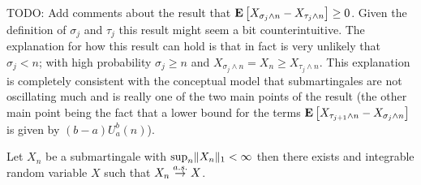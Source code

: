 TODO: Add comments about the result that $\textbf{E}\left[X_{\sigma_j
    \wedge n} - X_{\tau_j    \wedge n} \right]\geq 0$.  Given the definition
of $\sigma_j$ and $\tau_j$ this result might seem a bit
counterintuitive.  The explanation for how this result can hold is
that in fact is very unlikely that $\sigma_j < n$; with high
probability $\sigma_j \geq n$ and $X_{\sigma_j    \wedge n} = X_n \geq
X_{\tau_j \wedge n}$.  This explanation is completely consistent with
the conceptual model that submartingales are not oscillating much and
is really one of the two main points of the result (the other main point
being the fact that a lower bound for the terms
$\textbf{E}\left[X_{\tau_{j+1} \wedge n} - X_{\sigma_j   \wedge n}\right]$ is given by $(b-a) U_a^b(n)$).

\begin{thm}\label{MartingaleConvergenceBoundedL1Discrete}Let $X_n$ be a submartingale with $\sup_n \lVert X_n \rVert_1 <
  \infty$ then there exists and integrable random variable $X$ such
  that $X_n \overset{a.s.}\to X$.
\end{thm}
